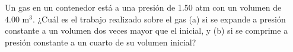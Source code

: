 \item Un gas en un contenedor está a una presión de 1.50 atm con un volumen de $4.00\text{ m}^3$. ¿Cuál es el trabajo realizado sobre el gas (a) si se expande a presión constante a un volumen dos veces mayor que el inicial, y (b) si se comprime a presión constante a un cuarto de su volumen inicial?
